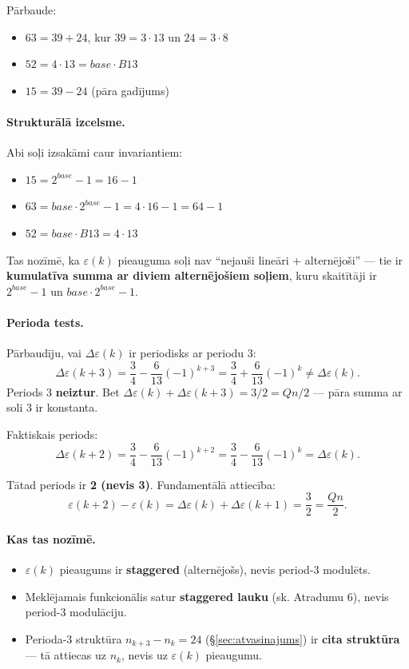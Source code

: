 \documentclass[12pt,a4paper]{article}
\begin{document}
Pārbaude:
\begin{itemize}
    \item $63 = 39 + 24$, kur $39 = 3 \cdot 13$ un $24 = 3 \cdot 8$
    \item $52 = 4 \cdot 13 = base \cdot B13$
    \item $15 = 39 - 24$ (pāra gadījums)
\end{itemize}

\paragraph{Strukturālā izcelsme.}
Abi soļi izsakāmi caur invariantiem:
\begin{itemize}
    \item $15 = 2^{base} - 1 = 16 - 1$
    \item $63 = base \cdot 2^{base} - 1 = 4 \cdot 16 - 1 = 64 - 1$
    \item $52 = base \cdot B13 = 4 \cdot 13$
\end{itemize}

Tas nozīmē, ka $\varepsilon(k)$ pieauguma soļi nav ``nejauši lineāri + alternējoši'' — tie ir \textbf{kumulatīva summa ar diviem alternējošiem soļiem}, kuru skaitītāji ir $2^{base}-1$ un $base \cdot 2^{base}-1$.

\paragraph{Perioda tests.}
Pārbaudīju, vai $\Delta\varepsilon(k)$ ir periodisks ar periodu 3:
\[
\Delta\varepsilon(k+3) = \frac{3}{4} - \frac{6}{13}(-1)^{k+3} = \frac{3}{4} + \frac{6}{13}(-1)^k \neq \Delta\varepsilon(k).
\]
Periods 3 \textbf{neiztur}. Bet $\Delta\varepsilon(k) + \Delta\varepsilon(k+3) = 3/2 = Qn/2$ — pāra summa ar soli 3 ir konstanta.

Faktiskais periods:
\[
\Delta\varepsilon(k+2) = \frac{3}{4} - \frac{6}{13}(-1)^{k+2} = \frac{3}{4} - \frac{6}{13}(-1)^k = \Delta\varepsilon(k).
\]

Tātad periods ir \textbf{2 (nevis 3)}. Fundamentālā attiecība:
\[
\varepsilon(k+2) - \varepsilon(k) = \Delta\varepsilon(k) + \Delta\varepsilon(k+1) = \frac{3}{2} = \frac{Qn}{2}.
\]

\paragraph{Kas tas nozīmē.}
\begin{itemize}
    \item $\varepsilon(k)$ pieaugums ir \textbf{staggered} (alternējošs), nevis period-3 modulēts.
    \item Meklējamais funkcionālis satur \textbf{staggered lauku} (sk. Atradumu 6), nevis period-3 modulāciju.
    \item Perioda-3 struktūra $n_{k+3} - n_k = 24$ (\S\ref{sec:atvasinajums}) ir \textbf{cita struktūra} — tā attiecas uz $n_k$, nevis uz $\varepsilon(k)$ pieaugumu.
\end{itemize}
\end{document}
